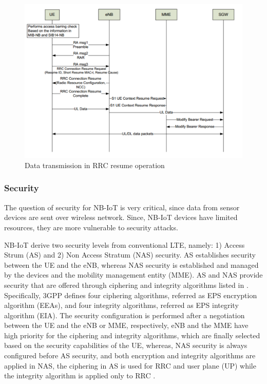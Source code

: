 \documentclass[12pt]{article}
\begin{document}
\begin{figure}[h]
    \centering
    \includegraphics[width=0.8\columnwidth]{Images/dataRRCresume.pdf}
    \caption{Data transmission in RRC resume operation \cite{ratasuk2016overview}}
    \label{fig:Sequence diagram of RRC resume cycle}
\end{figure}
 


\subsubsection{Security}

The question of security for NB-IoT is very critical, since data from sensor devices are sent over wireless network. Since, NB-IoT devices have limited resources, they are more vulnerable to security attacks.\par

NB-IoT derive two security levels from conventional LTE,
namely: 1) Access Strum (AS) and 2) Non Access Stratum (NAS) security. AS establishes security between the UE and the eNB, whereas NAS security is established and managed by the devices and the mobility management entity (MME). AS and NAS provide security that are offered through ciphering and integrity algorithms listed in \cite{3GPPsecurity}. Specifically, 3GPP defines four ciphering algorithms, referred as EPS encryption algorithm (EEAs), and four integrity algorithms, referred as EPS integrity algorithm (EIA). The security configuration is performed after a negotiation between the UE and the eNB or MME, respectively, eNB and the MME have high priority for the ciphering and integrity algorithms, which are finally selected based on the security capabilities of the UE, whereas, NAS security is always configured before AS security, and both encryption and integrity algorithms are applied in NAS, the ciphering in AS is used for RRC and user plane (UP) while the integrity algorithm is applied only to RRC \cite{martinez2019exploring}.
\end{document}
